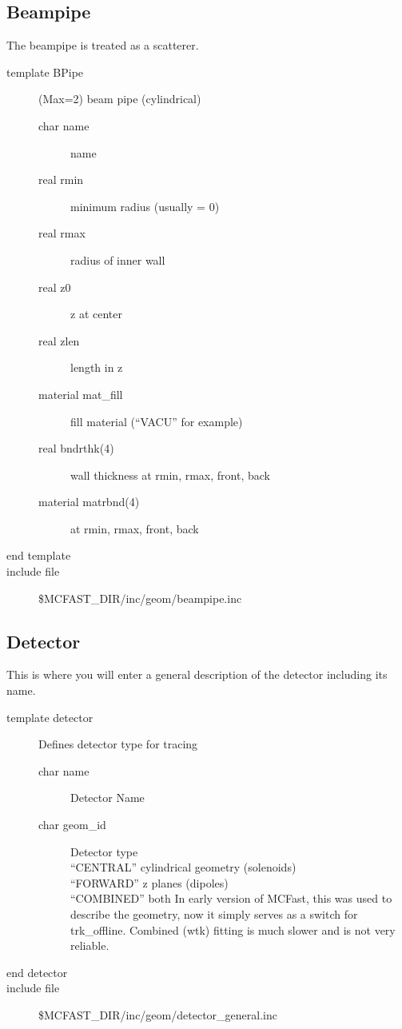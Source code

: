 \filbreak
\subsection{Beampipe}

The beampipe is treated as a scatterer.  

\begin{description}
\item[{\rm template} BPipe](Max=2)  beam pipe (cylindrical)
\begin{description}
\item[{\rm  char} name]    name
\item[{\rm  real} rmin]    minimum radius (usually = 0)
\item[{\rm  real} rmax]    radius of inner wall
\item[{\rm  real} z0]      z at center
\item[{\rm  real} zlen]    length in z
\item[{\rm  material} mat\_fill]  fill material (``VACU'' for example)
\item[{\rm  real} bndrthk(4)]   wall thickness at rmin, rmax, front, back
\item[{\rm  material} matrbnd(4)] at rmin, rmax, front, back
\end{description}
\item[end template]
\item[include file] \$MCFAST\_DIR/inc/geom/beampipe.inc
\end{description}

\subsection{Detector}
This is where you will enter a general description of the detector including its name.  

\begin{description}
\item[{\rm template} detector]  Defines detector type for tracing
\begin{description}
\item[{\rm  char} name]  Detector Name
\item[{\rm  char} geom\_id]   Detector type  \\``CENTRAL'' cylindrical geometry
(solenoids)\\
``FORWARD'' z planes (dipoles)\\ ``COMBINED'' both  In early version of MCFast, this
was used to describe the geometry, now it simply serves as a switch for trk\_offline.  
Combined (wtk) fitting is much slower and is not very reliable.\\
\end{description}
\item[end detector]
\item[include file] \$MCFAST\_DIR/inc/geom/detector\_general.inc
\end{description}

